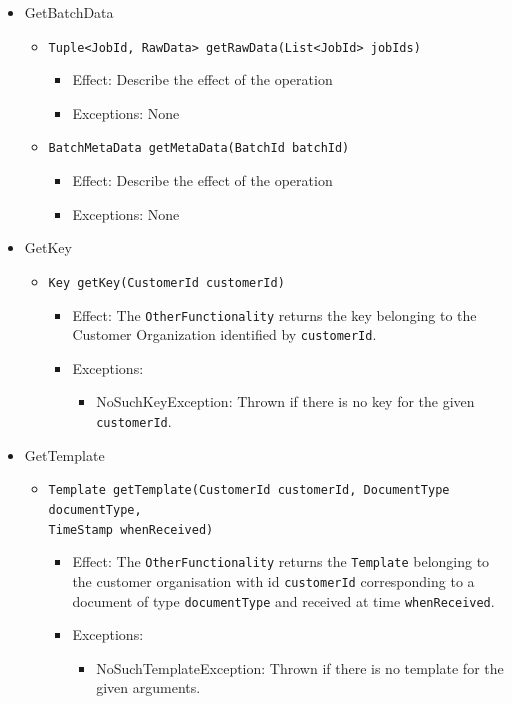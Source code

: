 \documentclass[a4paper,10pt]{article}
\begin{document}
\begin{itemize}
    \item GetBatchData
    \begin{itemize}
        \item \texttt{Tuple<JobId, RawData> getRawData(List<JobId> jobIds)}
        \begin{itemize}
            \item Effect: Describe the effect of the operation
            \item Exceptions: None
        \end{itemize}
        \item \texttt{BatchMetaData getMetaData(BatchId batchId)}
        \begin{itemize}
            \item Effect: Describe the effect of the operation
            \item Exceptions: None
        \end{itemize}
    \end{itemize}

    \item GetKey
    \begin{itemize}
        \item \texttt{Key getKey(CustomerId customerId)}
        \begin{itemize}
            \item Effect: The \texttt{OtherFunctionality} returns the key belonging to the Customer Organization identified by \texttt{customerId}.
            \item Exceptions:
            \begin{itemize}
                \item NoSuchKeyException: Thrown if there is no key for the given \texttt{customerId}.
            \end{itemize}
        \end{itemize}
    \end{itemize}
    
    \item GetTemplate
    \begin{itemize}
        \item \texttt{Template getTemplate(CustomerId customerId, DocumentType documentType, \\ TimeStamp whenReceived)}
        \begin{itemize}
            \item Effect:  The \texttt{OtherFunctionality} returns the \texttt{Template} belonging to the customer organisation with id \texttt{customerId} corresponding to a document of type \texttt{documentType} and received at time \texttt{whenReceived}. 
            \item Exceptions:
            \begin{itemize}
                \item NoSuchTemplateException: Thrown if there is no template for the given arguments.
            \end{itemize}
        \end{itemize}
    \end{itemize}
        

\end{itemize}
\end{document}
